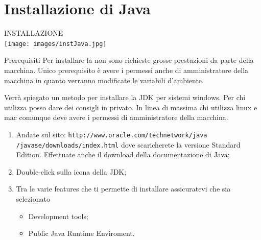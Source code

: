 \section*{Installazione di Java}
\begin{frame}
\begin{block}{}
\begin{center}
\alert{\large{INSTALLAZIONE}\\}
\texttt{[image: images/instJava.jpg]}
\end{center}
\end{block}
\end{frame}
\begin{frame}
\begin{block}{Prerequisiti}
Per installare la  non sono richieste grosse prestazioni da parte della macchina.
Unico prerequisito è avere i permessi anche di amministratore della macchina in quanto verranno modificate le variabili
d'ambiente.
\end{block}
\begin{block}{}
Verrà spiegato un metodo per installare la JDK per sistemi windows. Per chi utilizza  posso dare dei 
consigli in privato. In linea di massima chi utilizza linux e mac comunque deve avere i permessi di amministratore della
macchina.
\end{block}
\end{frame}

\begin{frame}
\begin{block}{}
\begin{enumerate}
\item Andate sul sito: \texttt{\footnotesize{http://www.oracle.com/technetwork/java\\/javase/downloads/index.html}} 
dove scaricherete la versione Standard Edition. Effettuate anche il download della documentazione di Java;
\item Double-click sulla icona della JDK;
\item Tra le varie features che ti permette di installare assicuratevi che sia selezionato
\begin{itemize}
\item Development tools;
\item Public Java Runtime Enviroment.
\end{itemize}
\end{enumerate}
\end{block}
\end{frame}
